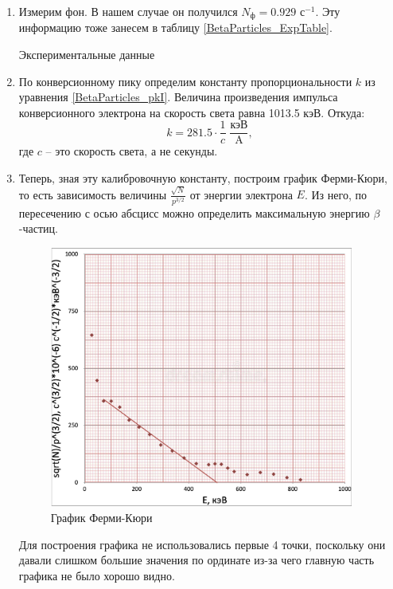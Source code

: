 \documentclass[12pt,a4paper]{article}
\begin{document}
\begin{enumerate}
		\item Измерим фон. В нашем случае он получился $N_\text{ф} = 0.929$ с$^{-1}$. Эту информацию тоже занесем в таблицу \ref{BetaParticles_ExpTable}. 


  \begin{table}[h!]
       \centering
       \footnotesize
       
       \caption{Экспериментальные данные}
       \label{BetaParticles_ExpTable}
    \end{table}

  \item По конверсионному пику определим константу пропорциональности $k$ из уравнения \eqref{BetaParticles_pkI}. Величина произведения импульса конверсионного электрона на скорость света равна 1013.5 кэВ. Откуда:
		\begin{equation*}
			k = 281.5 \cdot \frac{1}{c}\; \frac{\text{кэВ}}{\text{A}},
		\end{equation*}
	 	\noindent где $c$ -- это скорость света, а не секунды.
	 	
	 	\item Теперь, зная эту калибровочную константу, построим график Ферми-Кюри, то есть зависимость величины $\frac{\sqrt{N}}{p^{3/2}}$ от энергии электрона $E$. Из него, по пересечению с осью абсцисс можно определить максимальную энергию $\beta$-частиц.

		\begin{figure}[h!]
			\centering
			\includegraphics[width=10cm]{src/jopa(E).png}
			\caption{График Ферми-Кюри}
		\end{figure}
	
		Для построения графика не использовались первые 4 точки, поскольку они давали слишком большие значения по ординате из-за чего главную часть графика не было хорошо видно.
		

\end{enumerate}
\end{document}
